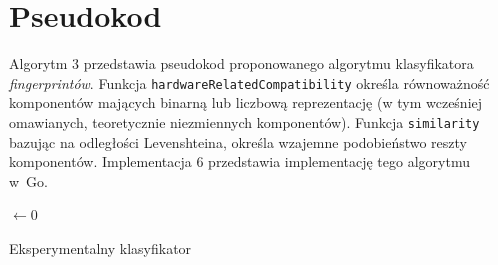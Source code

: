 

\section{Pseudokod}
Algorytm 3 przedstawia pseudokod proponowanego algorytmu klasyfikatora
\emph{fingerprintów}. Funkcja \texttt{hardwareRelatedCompatibility} określa
równoważność komponentów mających binarną lub liczbową reprezentację (w tym
wcześniej omawianych, teoretycznie niezmiennych komponentów). Funkcja
\texttt{similarity} bazując na odległości Levenshteina, określa wzajemne
podobieństwo reszty komponentów. Implementacja 6 przedstawia implementację tego
algorytmu w~Go.


\begin{algorithm}
	\SetAlgoVlined
	\BlankLine
	\BlankLine
	\VarMax $\leftarrow 0$\;
	\ForEach{\VarG $\in$ \SetG}{
		\If{\HardwareRelatedCompatibility{\VarF, \VarG} $< \alpha$}{
			\Continue\;
		}
		\BlankLine
		\VarRatio $\leftarrow$ \Similarity{\VarF, \VarG}\;
		\BlankLine
		\If{\VarRatio $>$ \VarMax}{
			\VarMax $\leftarrow$ \VarRatio\;
			\VarCandidate $\leftarrow$ \VarG\;
		}
	}
	\If{\VarMax $\ge \beta$}{
		\Return{\VarCandidate}\;
	}
	\Return{\Null}\;
	\caption{Eksperymentalny klasyfikator}
\end{algorithm}



